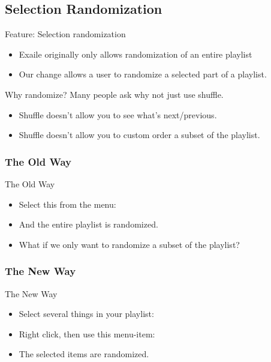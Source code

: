 \documentclass{beamer}
\begin{document}
\subsection{Selection Randomization}

\begin{frame}{Feature: Selection randomization}
  \begin{itemize}
     \item Exaile originally only allows randomization of an entire playlist
     \item Our change allows a user to randomize a selected part of a playlist.
  \end{itemize}
\end{frame}

\begin{frame}{Why randomize?}
  Many people ask why not just use shuffle.
  \begin{itemize}
    \item Shuffle doesn't allow you to see what's next/previous.
	\item Shuffle doesn't allow you to custom order a subset of the playlist.
  \end{itemize}
\end{frame}

\subsubsection{The Old Way}
\begin{frame}{The Old Way}
  \begin{itemize}
    \item Select this from the menu:

    \item And the entire playlist is randomized.
	\item What if we only want to randomize a subset of the playlist?
  \end{itemize}
\end{frame}

\subsubsection{The New Way}
\begin{frame}{The New Way}
  \begin{itemize}
  \item Select several things in your playlist:
  \item Right click, then use this menu-item:

  \item The selected items are randomized.
  \end{itemize}
\end{frame}
\end{document}
